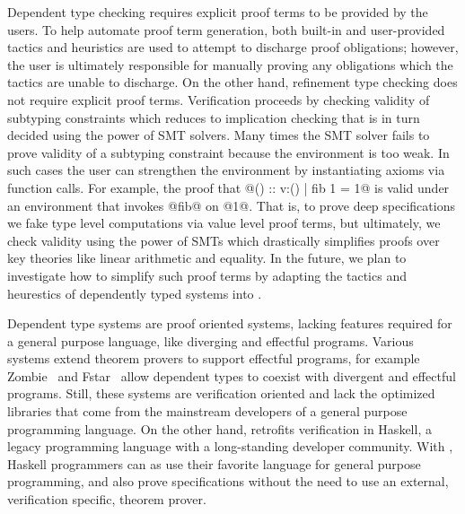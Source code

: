 Dependent type checking requires explicit proof terms to be provided by the users. 
%
To help automate proof term generation, both built-in and user-provided
tactics and heuristics are used to attempt to discharge proof obligations; however,
the user is ultimately responsible for manually proving any
obligations which the tactics are unable to discharge.
%
On the other hand, refinement type checking 
does not require explicit proof terms. 
%
Verification proceeds by checking validity of subtyping constraints 
which reduces to implication checking that is in turn
decided using the power of SMT solvers. 
%
Many times the SMT solver fails to prove 
validity of a subtyping constraint because the environment is too weak. 
%
In such cases the user can strengthen the environment by instantiating 
axioms via function calls. 
%
For example, the proof that @() :: {v:() | fib 1 = 1}@ 
is valid under an environment that invokes @fib@ on @1@.
%
That is, to prove deep specifications we fake type level computations
via value level proof terms, but ultimately, 
we check validity using the power of SMTs
which drastically simplifies proofs over key theories
like linear arithmetic and equality.
%
In the future, we plan to investigate how to simplify such proof terms
by adapting the tactics and heurestics of dependently typed systems
into \toolname. 

Dependent type systems are proof oriented systems, lacking 
features required for a general purpose language, like 
diverging and effectful programs. 
%
Various systems extend theorem provers to support effectful programs, 
for example 
Zombie~\cite{Zombie,Sjoberg2015} and Fstar~\cite{fstar} allow dependent types to
coexist with divergent and effectful programs. 
%
Still, these systems are verification oriented and lack the 
optimized libraries that come from the mainstream developers of 
a general purpose programming language.  
%
On the other hand, \toolname 
retrofits verification in Haskell,
a legacy programming language with 
a long-standing developer community. 
%
With \toolname, 
Haskell programmers can as use their favorite  
language for general purpose programming, 
and also prove specifications without the need to use an external, 
verification specific, theorem prover. 




